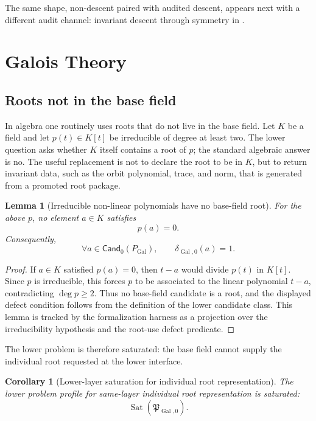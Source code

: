 \documentclass[11pt]{article}
\newcommand{\Gal}{\operatorname{Gal}}
\newtheorem{lemma}[theorem]{Lemma}
\newtheorem{corollary}[theorem]{Corollary}
\theoremstyle{definition}
\begin{document}
The same shape, non-descent paired with audited descent, appears next with a
different audit channel: invariant descent through symmetry in .
 \section{Galois Theory}\label{sec:galois}

\subsection{Roots not in the base field}
\label{subsec:gal-roots-not-in-base}

In algebra one routinely uses roots that do not live in the base field.  Let
\(K\) be a field and let \(p(t)\in K[t]\) be irreducible of degree at least
two.  The lower question asks whether \(K\) itself contains a root of \(p\); the
standard algebraic answer is no.  The useful replacement is not to declare the
root to be in \(K\), but to return invariant data, such as the orbit polynomial,
trace, and norm, that is generated from a promoted root package.

\begin{lemma}[Irreducible non-linear polynomials have no base-field root]
\label{lem:gal-no-base-root}
For the above \(p\), no element \(a\in K\) satisfies
\[
p(a)=0.
\]
Consequently,
\[
\forall a\in\mathsf{Cand}_0(P_{\Gal}),
\qquad
\delta_{\Gal,0}(a)=1.
\]
\end{lemma}

\begin{proof}
If \(a\in K\) satisfied \(p(a)=0\), then \(t-a\) would divide \(p(t)\) in
\(K[t]\).  Since \(p\) is irreducible, this forces \(p\) to be associated to the
linear polynomial \(t-a\), contradicting \(\deg p\ge2\).  Thus no base-field
candidate is a root, and the displayed defect condition follows from the
definition of the lower candidate class.  This lemma is tracked by the
formalization harness as a projection over the irreducibility hypothesis and the
root-use defect predicate.
\end{proof}

The lower problem is therefore saturated: the base field cannot supply the
individual root requested at the lower interface.

\begin{corollary}[Lower-layer saturation for individual root representation]
\label{cor:gal-root-saturation}
The lower problem profile for same-layer individual root representation is saturated:
\[
\operatorname{Sat}(\mathfrak P_{\Gal,0}).
\]
\end{corollary}
\end{document}

